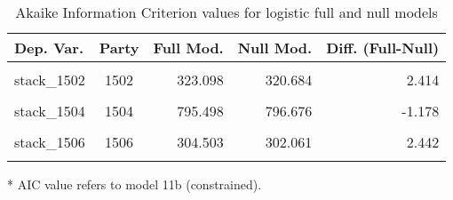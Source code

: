 \documentclass[
]{article}
\begin{document}
\begin{table}[!h]

\caption{\label{tab:unnamed-chunk-98}Akaike Information Criterion values for logistic full and null models 
        \label{table:logit_aic_it}}
\centering
\begin{threeparttable}
\begin{tabular}[t]{lcrrr}
\toprule
Dep. Var. & Party & Full Mod. & Null Mod. & Diff. (Full-Null)\\
\midrule
\cellcolor{gray!6}{stack\_1501} & \cellcolor{gray!6}{1501} & \cellcolor{gray!6}{790.955} & \cellcolor{gray!6}{796.676} & \cellcolor{gray!6}{-5.721}\\
stack\_1502 & 1502 & 323.098 & 320.684 & 2.414\\
\cellcolor{gray!6}{stack\_1503} & \cellcolor{gray!6}{1503} & \cellcolor{gray!6}{1013.665} & \cellcolor{gray!6}{1012.910} & \cellcolor{gray!6}{0.756}\\
stack\_1504 & 1504 & 795.498 & 796.676 & -1.178\\
\cellcolor{gray!6}{stack\_1505} & \cellcolor{gray!6}{1505} & \cellcolor{gray!6}{203.427} & \cellcolor{gray!6}{200.042} & \cellcolor{gray!6}{3.384}\\
\addlinespace
stack\_1506 & 1506 & 304.503 & 302.061 & 2.442\\
\cellcolor{gray!6}{stack\_1507} & \cellcolor{gray!6}{1507} & \cellcolor{gray!6}{322.427} & \cellcolor{gray!6}{314.532} & \cellcolor{gray!6}{7.895}\\
\bottomrule
\end{tabular}
\begin{tablenotes}[para]
\item[*] AIC value refers to model 11b (constrained).
\end{tablenotes}
\end{threeparttable}
\end{table}
\end{document}
